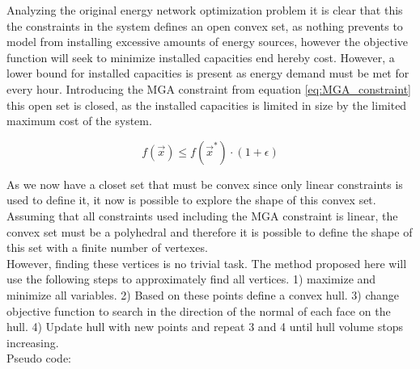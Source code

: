 Analyzing the original energy network optimization problem it is clear that this the constraints in the system defines an open convex set, as nothing prevents to model from installing excessive amounts of energy sources, however the objective function will seek to minimize installed capacities end hereby cost. However, a lower bound for installed capacities is present as energy demand must be met for every hour. 
Introducing the MGA constraint from equation \ref{eq:MGA_constraint} this open set is closed, as the installed capacities is limited in size by the limited maximum cost of the system. 

\begin{equation}\label{eq:MGA_constraint}
	f(\vec{x}) \leqslant f(\vec{x}^*) \cdot (1+\epsilon)
\end{equation}

As we now have a closet set that must be convex since only linear constraints is used to define it, it now is possible to explore the shape of this convex set. Assuming that all constraints used including the MGA constraint is linear, the convex set must be a polyhedral and therefore it is possible to define the shape of this set with a finite number of vertexes. \\

However, finding these vertices is no trivial task. The method proposed here will use the following steps to approximately find all vertices. 1) maximize and minimize all variables. 2) Based on these points define a convex hull. 3) change objective function to search in the direction of the normal of each face on the hull. 4) Update hull with new points and repeat 3 and 4 until hull volume stops increasing. \\

Pseudo code:

